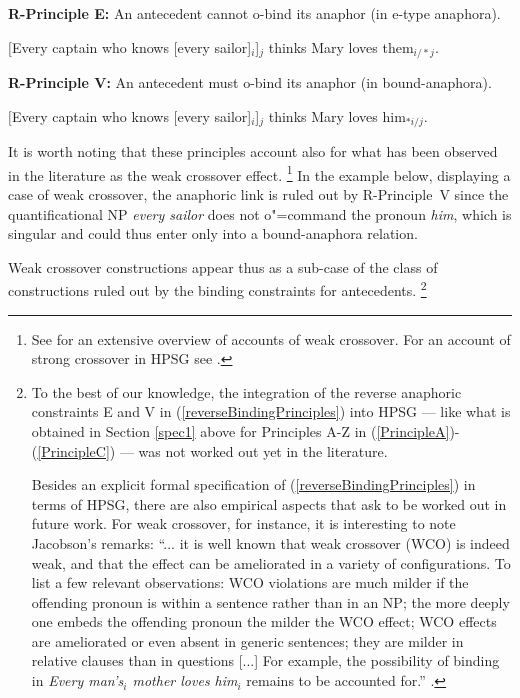 \documentclass[output=paper
	        ,collection
	        ,collectionchapter
 	        ,biblatex
                ,babelshorthands
                ,newtxmath
                ,draftmode
                ,colorlinks, citecolor=brown
]{langscibook}
\begin{document}

\begin{exe}
\ex\label{reverseBindingPrinciples}
{\textbf{R-Principle E:}} An antecedent cannot o-bind its anaphor (in \mbox{e-type} anaphora).

\sn
{$[$Every captain who knows [every sailor]$_{i}$]$_{j}$ thinks Mary loves them$_{i/*j}$.}
\end{exe}


\begin{exe}
\sn
{\textbf{R-Principle V:}} An antecedent must o-bind its anaphor (in bound-anaphora).

\sn
{$[$Every captain who knows [every sailor]$_{i}$]$_{j}$ thinks Mary loves him$_{*i/j}$.}
\end{exe}





It is worth noting that these principles account also for what has been observed in the literature 
as the weak crossover effect.%
\footnote{See \citep[Section~2.1]{jacobson:paycheck2000} for an extensive overview of 
accounts of weak crossover. For an account of strong crossover in HPSG see
\citep[]{polsag:hpsg94}. }
% 
In the example below, displaying a case
of weak crossover, the anaphoric link is ruled out
by \mbox{R-Principle V} since the quantificational NP {\em every sailor} does not
o"=command the pronoun {\em him}, which is singular and could thus enter
only into a bound-anaphora relation. 

\begin{exe}
\end{exe}

Weak crossover constructions
appear thus as a sub-case of the class of constructions ruled out
by the binding constraints for antecedents.%
\footnote{
To the best of our knowledge, the integration of the reverse anaphoric constraints 
E and V in (\ref{reverseBindingPrinciples}) into HPSG ---
like what is obtained in Section \ref{spec1} above for Principles A-Z in (\ref{PrincipleA})-(\ref{PrincipleC}) ---
was not worked out yet in the literature.

Besides an explicit formal specification of (\ref{reverseBindingPrinciples}) in terms of HPSG, 
there are also empirical aspects
that ask to be worked out in future work. 
For weak crossover, for instance, it is interesting to note Jacobson's remarks: ``... it is well known
that weak crossover (WCO) is indeed weak, and that the effect can be
ameliorated in a variety of configurations. To list a few relevant
observations: WCO violations are much milder if the offending
pronoun is within a sentence rather than in an NP; the more deeply
one embeds the offending pronoun the milder the WCO effect;
WCO effects are ameliorated or even absent in generic sentences;
they are milder in relative clauses than in questions [...] For example,
the possibility of binding in {\em Every man's$_{i}$ mother loves him$_{i}$}
remains to be accounted for.'' \citep[]{jacobson:paycheck2000}.
}
%
\end{document}
